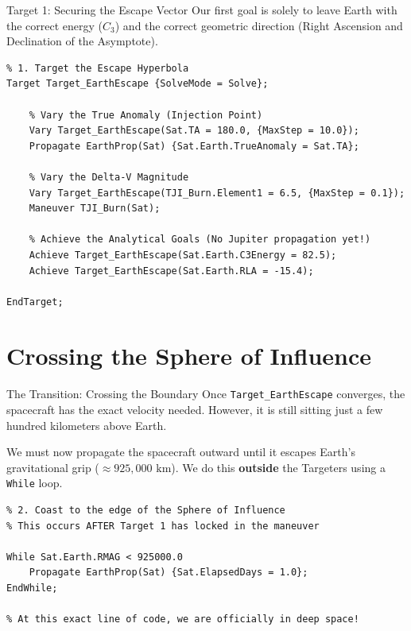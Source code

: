 \documentclass[11pt]{beamer}
\begin{document}
\begin{frame}[fragile]{Target 1: Securing the Escape Vector}
    Our first goal is solely to leave Earth with the correct energy ($C_3$) and the correct geometric direction (Right Ascension and Declination of the Asymptote).
    
\begin{lstlisting}
% 1. Target the Escape Hyperbola
Target Target_EarthEscape {SolveMode = Solve};
    
    % Vary the True Anomaly (Injection Point)
    Vary Target_EarthEscape(Sat.TA = 180.0, {MaxStep = 10.0});
    Propagate EarthProp(Sat) {Sat.Earth.TrueAnomaly = Sat.TA};
    
    % Vary the Delta-V Magnitude
    Vary Target_EarthEscape(TJI_Burn.Element1 = 6.5, {MaxStep = 0.1});
    Maneuver TJI_Burn(Sat);
    
    % Achieve the Analytical Goals (No Jupiter propagation yet!)
    Achieve Target_EarthEscape(Sat.Earth.C3Energy = 82.5);
    Achieve Target_EarthEscape(Sat.Earth.RLA = -15.4);
    
EndTarget;
\end{lstlisting}
\end{frame}

\section{Crossing the Sphere of Influence}

\begin{frame}[fragile]{The Transition: Crossing the Boundary}
    Once \texttt{Target\_EarthEscape} converges, the spacecraft has the exact velocity needed. However, it is still sitting just a few hundred kilometers above Earth.
    
    \vspace{0.2cm}
    We must now propagate the spacecraft outward until it escapes Earth's gravitational grip ($\approx 925,000 \text{ km}$). We do this \textbf{outside} the Targeters using a \texttt{While} loop.
    
\begin{lstlisting}
% 2. Coast to the edge of the Sphere of Influence
% This occurs AFTER Target 1 has locked in the maneuver

While Sat.Earth.RMAG < 925000.0
    Propagate EarthProp(Sat) {Sat.ElapsedDays = 1.0};
EndWhile;

% At this exact line of code, we are officially in deep space!
\end{lstlisting}
\end{frame}
\end{document}
